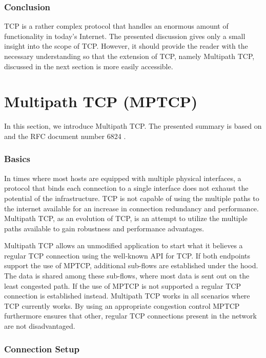 \subsubsection{Conclusion}

TCP is a rather complex protocol that handles an enormous amount of functionality in today's Internet. The presented discussion gives only a small insight into the scope of TCP. However, it should provide the reader with the necessary understanding so that the extension of TCP, namely Multipath TCP, discussed in the next section is more easily accessible.

\section{Multipath TCP (MPTCP)}
\label{sec:MPTCP}

In this section, we introduce Multipath TCP. The presented summary is based on \cite{Barre2011, Raiciu2012, Wischik2011} and the RFC document number 6824 \cite{rfc6824}.

\subsubsection{Basics}

In times where most hosts are equipped with multiple physical interfaces, a protocol that binds each connection to a single interface does not exhaust the potential of the infrastructure. TCP is not capable of using the multiple paths to the internet available for an increase in connection redundancy and performance. Multipath TCP, as an evolution of TCP, is an attempt to utilize the multiple paths available to gain robustness and performance advantages.

Multipath TCP allows an unmodified application to start what it believes a regular TCP connection using the well-known API for TCP. If both endpoints support the use of MPTCP, additional sub-flows are established under the hood. The data is shared among these sub-flows, where most data is sent out on the least congested path. If the use of MPTCP is not supported a regular TCP connection is established instead. Multipath TCP works in all scenarios where TCP currently works. By using an appropriate congestion control MPTCP furthermore ensures that other, regular TCP connections present in the network are not disadvantaged. 

\subsubsection{Connection Setup}

